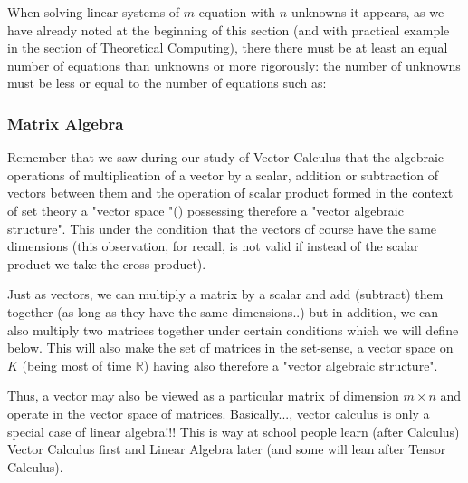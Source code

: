 	When solving linear systems of $m$ equation with $n$ unknowns it appears, as we have already noted at the beginning of this section (and with practical example in the section of Theoretical Computing), there there must be at least an equal number of equations than unknowns or more rigorously: the number of unknowns must be less or equal to the number of equations such as:
	
	
	\pagebreak
	\subsubsection{Matrix Algebra}
	Remember that we saw during our study of Vector Calculus that the algebraic operations of multiplication of a vector by a scalar, addition or subtraction of vectors between them and the operation of scalar product formed in the context of set theory a "vector space "() possessing therefore a "vector algebraic structure". This under the condition that the vectors of course have the same dimensions (this observation, for recall, is not valid if instead of the scalar product we take the cross product).
	
	Just as vectors, we can multiply a matrix by a scalar and add (subtract) them together (as long as they have the same dimensions..) but in addition, we can also multiply two matrices together under certain conditions which we will define below. This will also make the set of matrices in the set-sense, a vector space on $K$ (being most of time $\mathbb{R}$) having also therefore a "vector algebraic structure".
	
	Thus, a vector may also be viewed as a particular matrix of dimension $m\times n$  and operate in the vector space of matrices. Basically..., vector calculus is only a special case of linear algebra!!! This is way at school people learn (after Calculus) Vector Calculus first and Linear Algebra later (and some will lean after Tensor Calculus).
	
